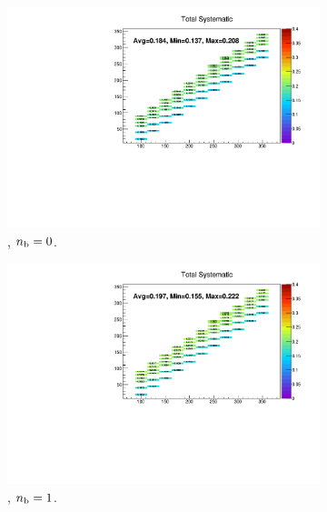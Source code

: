 \begin{figure}[h!]
  \centering
  \begin{subfigure}[b]{0.47\textwidth}
    \includegraphics[width=\textwidth]{Figs/sms/t2cc/v37_2/systs/total_T2cc_eq0b_le3j_incl.pdf}
    \caption{\njlow, $n_{\text{b}} = 0$.}
  \end{subfigure}
  \begin{subfigure}[b]{0.47\textwidth}
    \includegraphics[width=\textwidth]{Figs/sms/t2cc/v37_2/systs/total_T2cc_eq1b_le3j_incl.pdf}
    \caption{\njlow, $n_{\text{b}} = 1$.}
  \end{subfigure}\\
  \begin{subfigure}[b]{0.47\textwidth}

\end{subfigure}
\end{figure}

